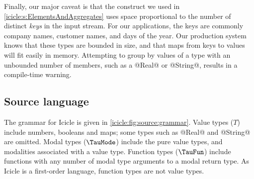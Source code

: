 Finally, our major caveat is that the \Ic@group@ construct we used in \cref{icicle:s:ElementsAndAggregates} uses space proportional to the number of distinct \emph{keys} in the input stream.
For our applications, the keys are commonly company names, customer names, and days of the year.
Our production system knows that these types are bounded in size, and that maps from keys to values will fit easily in memory.
Attempting to group by values of a type with an unbounded number of members, such as a @Real@ or @String@, results in a compile-time warning.




\subsection{Source language}
\label{icicle:s:IcicleSource}

The grammar for Icicle is given in \cref{icicle:fig:source:grammar}.
Value types ($T$) include numbers, booleans and maps; some types such as @Real@ and @String@ are omitted.
Modal types ($\TauMode$) include the pure value types, and modalities associated with a value type.
Function types ($\TauFun$) include functions with any number of modal type arguments to a modal return type.
As Icicle is a first-order language, function types are not value types.


